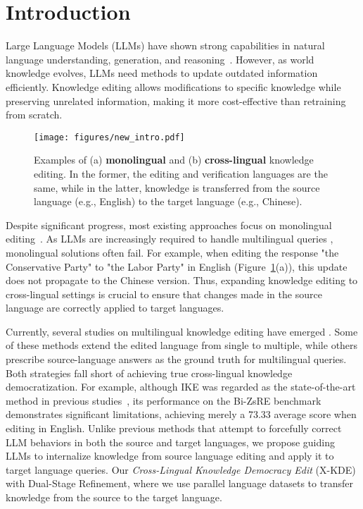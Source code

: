 \section{Introduction}

Large Language Models (LLMs) \cite{achiam2023gpt, dubey2024llama, yang2024qwen2, guo2025deepseek} have shown strong capabilities in natural language understanding, generation, and reasoning~\cite{wei2022emergent, zhong2023can, peng2023towards, lu-etal-2024-error, zhao2023survey}. However, as world knowledge evolves, LLMs need methods to update outdated information efficiently. Knowledge editing \cite{yao2023editing} allows modifications to specific knowledge while preserving unrelated information, making it more cost-effective than retraining from scratch.

\begin{figure}[!t]
\centering
\texttt{[image: figures/new\_intro.pdf]}
\caption{Examples of (a) \textbf{monolingual} and (b) \textbf{cross-lingual} knowledge editing. In the former, the editing and verification languages are the same, while in the latter, knowledge is transferred from the source language (e.g., English) to the target language (e.g., Chinese).
}
\vspace{-10pt}
\label{fig:intro}
\end{figure}
Despite significant progress, most existing approaches focus on monolingual editing~\cite{de2021editing,dai2021knowledge,mitchell2021fast}. As LLMs are increasingly required to handle multilingual queries \cite{zhang2024comprehensive, wang2023towards}, monolingual solutions often fail. For example, when editing the response "the Conservative Party" to "the Labor Party" in English (Figure~\ref{fig:intro}(a)), this update does not propagate to the Chinese version. Thus, expanding knowledge editing to cross-lingual settings is crucial to ensure that changes made in the source language are correctly applied to target languages.

Currently, several studies on multilingual knowledge editing have emerged \cite{xu2022language, wang2023retrieval, wei2024mlake, xie2024memla, liang2024multilingual}. Some of these methods extend the edited language from single to multiple, while others prescribe source-language answers as the ground truth for multilingual queries. Both strategies fall short of achieving true cross-lingual knowledge democratization. For example, although IKE was regarded as the state-of-the-art method in previous studies~\cite{wang2023cross,xie2024memla}, its performance on the Bi-ZsRE benchmark demonstrates significant limitations, achieving merely a 73.33 average score when editing in English. Unlike previous methods that attempt to forcefully correct LLM behaviors in both the source and target languages, we propose guiding LLMs to internalize knowledge from source language editing and apply it to target language queries. Our \textit{Cross-Lingual Knowledge Democracy Edit} (X-KDE) with Dual-Stage Refinement, where we use parallel language datasets to transfer knowledge from the source to the target language.

